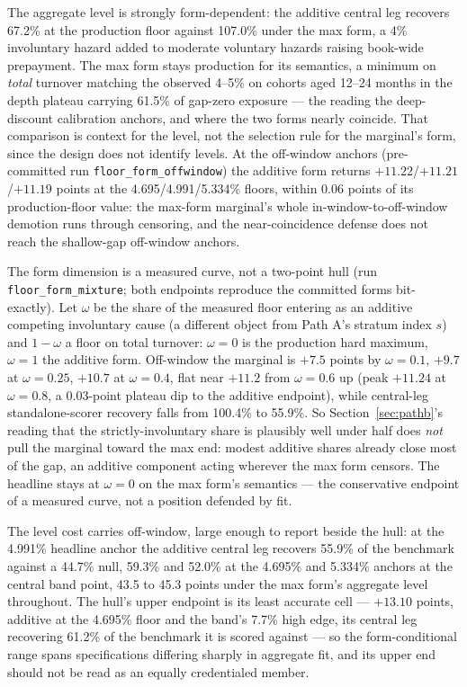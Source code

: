 The aggregate level is strongly form-dependent: the additive central leg recovers 67.2\% at the production floor against 107.0\% under the max form, a 4\% involuntary hazard added to moderate voluntary hazards raising book-wide prepayment. The max form stays production for its semantics, a minimum on \emph{total} turnover matching the observed 4--5\% on cohorts aged 12--24 months in the depth plateau carrying 61.5\% of gap-zero exposure --- the reading the deep-discount calibration anchors, and where the two forms nearly coincide. That comparison is context for the level, not the selection rule for the marginal's form, since the design does not identify levels. At the off-window anchors (pre-committed run \texttt{floor\_form\_offwindow}) the additive form returns $+11.22$/$+11.21$/$+11.19$ points at the 4.695/4.991/5.334\% floors, within 0.06 points of its production-floor value: the max-form marginal's whole in-window-to-off-window demotion runs through censoring, and the near-coincidence defense does not reach the shallow-gap off-window anchors.

The form dimension is a measured curve, not a two-point hull (run \texttt{floor\_form\_mixture}; both endpoints reproduce the committed forms bit-exactly). Let $\omega$ be the share of the measured floor entering as an additive competing involuntary cause (a different object from Path A's stratum index $s$) and $1-\omega$ a floor on total turnover: $\omega = 0$ is the production hard maximum, $\omega = 1$ the additive form. Off-window the marginal is $+7.5$ points by $\omega = 0.1$, $+9.7$ at $\omega = 0.25$, $+10.7$ at $\omega = 0.4$, flat near $+11.2$ from $\omega = 0.6$ up (peak $+11.24$ at $\omega = 0.8$, a 0.03-point plateau dip to the additive endpoint), while central-leg standalone-scorer recovery falls from 100.4\% to 55.9\%. So Section~\ref{sec:pathb}'s reading that the strictly-involuntary share is plausibly well under half does \emph{not} pull the marginal toward the max end: modest additive shares already close most of the gap, an additive component acting wherever the max form censors. The headline stays at $\omega = 0$ on the max form's semantics --- the conservative endpoint of a measured curve, not a position defended by fit.

The level cost carries off-window, large enough to report beside the hull: at the 4.991\% headline anchor the additive central leg recovers 55.9\% of the benchmark against a 44.7\% null, 59.3\% and 52.0\% at the 4.695\% and 5.334\% anchors at the central band point, 43.5 to 45.3 points under the max form's aggregate level throughout. The hull's upper endpoint is its least accurate cell --- $+13.10$ points, additive at the 4.695\% floor and the band's 7.7\% high edge, its central leg recovering 61.2\% of the benchmark it is scored against --- so the form-conditional range spans specifications differing sharply in aggregate fit, and its upper end should not be read as an equally credentialed member.

